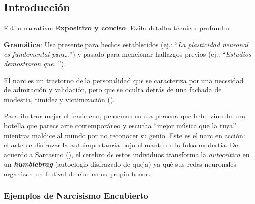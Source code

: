 \documentclass[
  10pt]{article}
\begin{document}
\newpage
\printacronyms[name=Abreviaturas]    

\newpage


\newpage



\newpage
{}
\subsection{Introducción}\label{sec-intro}

\begin{tcolorbox}[enhanced jigsaw, colframe=quarto-callout-tip-color-frame, colback=white, colbacktitle=quarto-callout-tip-color!10!white, leftrule=.75mm, left=2mm, breakable, coltitle=black, toptitle=1mm, bottomtitle=1mm, rightrule=.15mm, titlerule=0mm, title=\textcolor{quarto-callout-tip-color}{\faLightbulb}\hspace{0.5em}{Tip}, arc=.35mm, bottomrule=.15mm, opacitybacktitle=0.6, opacityback=0, toprule=.15mm]

Estilo narrativo: \textbf{Expositivo y conciso}. Evita detalles técnicos
profundos.

\textbf{Gramática}: Usa presente para hechos establecidos (ej.:
``\emph{La plasticidad neuronal es fundamental para\ldots{}}'') y pasado
para mencionar hallazgos previos (ej.: ``\emph{Estudios demostraron
que\ldots{}}'').

\end{tcolorbox}

El \ac{narc} es un trastorno de la personalidad que se caracteriza por
una necesidad de admiración y validación, pero que se oculta detrás de
una fachada de modestia, timidez y victimización
().

Para ilustrar mejor el fenómeno, pensemos en esa persona que bebe vino
de una botella que parece arte contemporáneo y escucha ``mejor música
que la tuya'' mientras maldice al mundo por no reconocer su genio. Este
es el \ac{narc}  en
acción: el arte de disfrazar la autoimportancia bajo el manto de la
falsa modestia. De acuerdo a Sarcasmo
(), el cerebro de estos
individuos transforma la \emph{autocrítica} en un
\textbf{\emph{humblebrag}} (autoelogio disfrazado de queja) ya qué sus
redes neuronales organizan un festival de cine en su propio honor.

\subsubsection{Ejemplos de Narcisismo
Encubierto}\label{ejemplos-de-narcisismo-encubierto}
\end{document}
